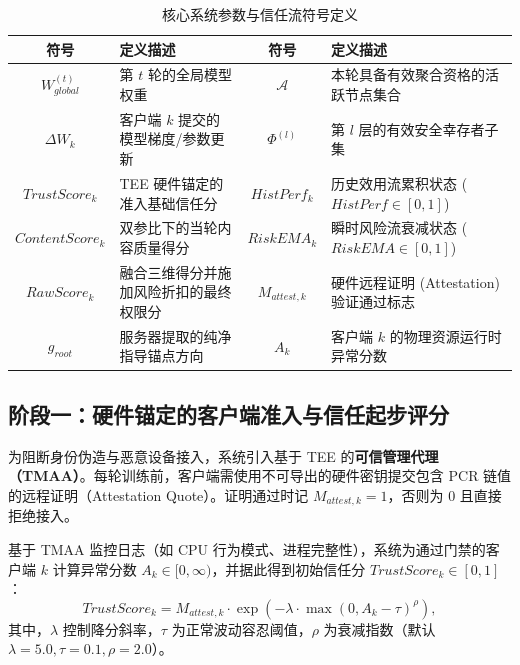 \documentclass[11pt, a4paper, UTF8, fontset=fandol]{ctexart}
\begin{document}
\begin{table}[htbp]
\centering
\caption{核心系统参数与信任流符号定义}
\label{tab:notations}
\begin{tabular}{cl | cl}
\toprule
\textbf{符号} & \textbf{定义描述} & \textbf{符号} & \textbf{定义描述} \\
\midrule
$W_{global}^{(t)}$ & 第 $t$ 轮的全局模型权重 & $\mathcal{A}$ & 本轮具备有效聚合资格的活跃节点集合 \\
$\Delta W_k$ & 客户端 $k$ 提交的模型梯度/参数更新 & $\Phi^{(l)}$ & 第 $l$ 层的有效安全幸存者子集 \\
$TrustScore_k$ & TEE 硬件锚定的准入基础信任分 & $HistPerf_k$ & 历史效用流累积状态 ($HistPerf \in [0, 1]$)\\
$ContentScore_k$ & 双参比下的当轮内容质量得分 & $RiskEMA_k$ & 瞬时风险流衰减状态 ($RiskEMA \in [0, 1]$)\\
$RawScore_k$ & 融合三维得分并施加风险折扣的最终权限分 & $M_{attest,k}$ & 硬件远程证明 (Attestation) 验证通过标志 \\
$g_{root}$ & 服务器提取的纯净指导锚点方向 & $A_k$ & 客户端 $k$ 的物理资源运行时异常分数 \\
\bottomrule
\end{tabular}
\end{table}

\subsection{阶段一：硬件锚定的客户端准入与信任起步评分}
为阻断身份伪造与恶意设备接入，系统引入基于 TEE 的\textbf{可信管理代理（TMAA）}。每轮训练前，客户端需使用不可导出的硬件密钥提交包含 PCR 链值的远程证明（Attestation Quote）。证明通过时记 $M_{attest,k}=1$，否则为 0 且直接拒绝接入。

基于 TMAA 监控日志（如 CPU 行为模式、进程完整性），系统为通过门禁的客户端 $k$ 计算异常分数 $A_k \in [0, \infty)$，并据此得到初始信任分 $TrustScore_k \in [0,1]$：
\begin{equation}
    TrustScore_{k} = M_{attest,k} \cdot \exp\left(-\lambda \cdot\max(0, A_{k} - \tau)^{\rho}\right),
\end{equation}
其中，$\lambda$ 控制降分斜率，$\tau$ 为正常波动容忍阈值，$\rho$ 为衰减指数（默认 $\lambda=5.0,\tau=0.1,\rho=2.0$）。
\end{document}
